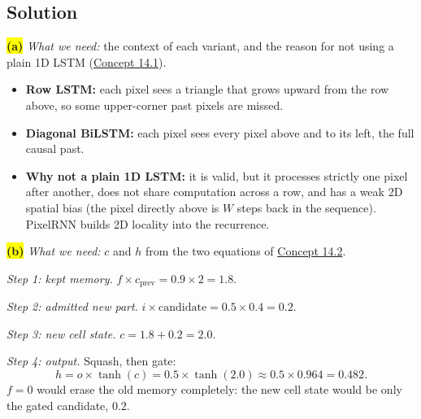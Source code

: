 \documentclass[12pt,a4paper]{article}
\begin{document}
\subsection{Solution}

\colorbox{yellow}{\textbf{(a)}} \emph{What we need:} the context of each variant, and the reason for not using a plain 1D LSTM (\hyperref[c14-1]{Concept 14.1}).
\begin{itemize}[nosep]
  \item \textbf{Row LSTM:} each pixel sees a triangle that grows upward from the row above, so some upper-corner past pixels are missed.
  \item \textbf{Diagonal BiLSTM:} each pixel sees every pixel above and to its left, the full causal past.
  \item \textbf{Why not a plain 1D LSTM:} it is valid, but it processes strictly one pixel after another, does not share computation across a row, and has a weak 2D spatial bias (the pixel directly above is $W$ steps back in the sequence). PixelRNN builds 2D locality into the recurrence.
\end{itemize}

\colorbox{yellow}{\textbf{(b)}} \emph{What we need:} $c$ and $h$ from the two equations of \hyperref[c14-2]{Concept 14.2}.

\emph{Step 1: kept memory.} $f\times c_{\text{prev}}=0.9\times2=1.8$.

\emph{Step 2: admitted new part.} $i\times\text{candidate}=0.5\times0.4=0.2$.

\emph{Step 3: new cell state.} $c=1.8+0.2=2.0$.

\emph{Step 4: output.} Squash, then gate:
\[
h=o\times\tanh(c)=0.5\times\tanh(2.0)\approx0.5\times0.964=0.482 .
\]
\emph{$f=0$} would erase the old memory completely: the new cell state would be only the gated candidate, $0.2$.
\end{document}
